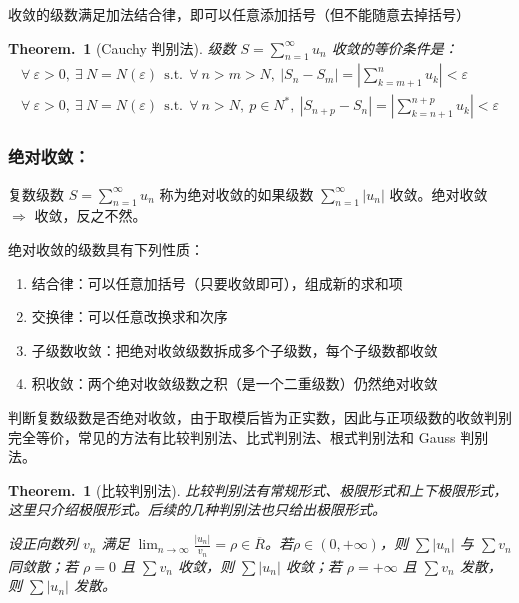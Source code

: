 \documentclass[UTF8]{report}
\theoremstyle{MyLineTheoremStyle} %
\theoremstyle{MyBlockTheoremStyle} %
\newtheorem{BlockTheorem}[LineTheorem]{Theorem.\,} %
\theoremstyle{MySubsubsectionStyle} %
\begin{document}
收敛的级数满足加法结合律，即可以任意添加括号（但不能随意去掉括号）

\begin{BlockTheorem}[Cauchy 判别法]\label{Cauchy 判别法}
    级数 $S = \sum_{n =1}^{\infty} u_n$ 收敛的等价条件是：
    \begin{gather}
    \forall\ \varepsilon > 0,\ \exists\ N = N(\varepsilon)\ \ \text{s.t.}\ \ \forall\ n > m > N,\ | S_{n} - S_m | =  \left| \sum_{k=m+1}^{n} u_k \right| < \varepsilon \\ 
    \forall\ \varepsilon > 0,\ \exists\ N = N(\varepsilon)\ \ \text{s.t.}\ \ \forall\ n > N,\ p \in N^*,\ | S_{n + p} - S_n | =  \left| \sum_{k=n+1}^{n+p} u_k \right| < \varepsilon
\end{gather}
\end{BlockTheorem}

\subsubsection{绝对收敛：}
复数级数 $\displaystyle S = \sum_{n = 1}^{\infty} u_n$ 称为绝对收敛的如果级数 $\displaystyle \sum_{n = 1}^{\infty} | u_n |$ 收敛。绝对收敛 $\Longrightarrow $ 收敛，反之不然。

绝对收敛的级数具有下列性质：
\begin{enumerate}
\item 结合律：可以任意加括号（只要收敛即可），组成新的求和项
\item 交换律：可以任意改换求和次序
\item 子级数收敛：把绝对收敛级数拆成多个子级数，每个子级数都收敛
\item 积收敛：两个绝对收敛级数之积（是一个二重级数）仍然绝对收敛
\end{enumerate}

判断复数级数是否绝对收敛，由于取模后皆为正实数，因此与正项级数的收敛判别完全等价，常见的方法有比较判别法、比式判别法、根式判别法和 Gauss 判别法。

\begin{BlockTheorem}[比较判别法]\label{比较判别法}
比较判别法有常规形式、极限形式和上下极限形式，这里只介绍极限形式。后续的几种判别法也只给出极限形式。

设正向数列 $v_n$ 满足 $\displaystyle \lim_{n \to \infty} \frac{| u_n |}{v_n} = \rho \in \overline{R}$。若$\rho \in (0, +\infty)$，则 $\sum | u_n |$ 与 $\sum v_n$ 同敛散；若 $\rho = 0$ 且 $\sum v_n$ 收敛，则 $\sum | u_n |$ 收敛；若 $\rho = +\infty$ 且 $ \sum v_n$ 发散，则 $\sum | u_n |$ 发散。
\end{BlockTheorem}
\end{document}
